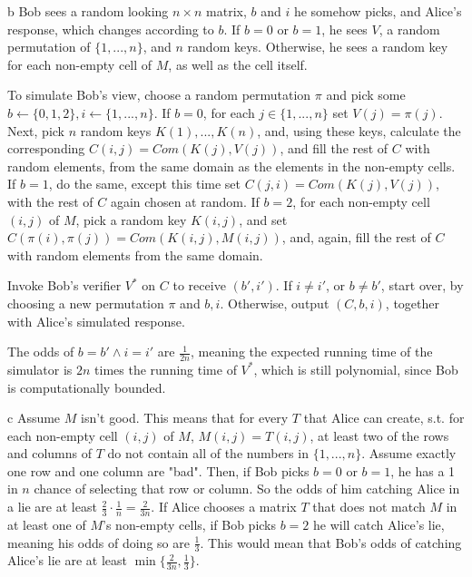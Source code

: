 \documentclass{article}
\begin{document}
\begin{paragraph}
    b Bob sees a random looking \(n \times n\) matrix, \(b\) and \(i\) he somehow picks, and Alice's response, which changes according to \(b\). If \(b = 0\) or \(b = 1\), he sees \(V\), a random permutation of \(\{1, ..., n\}\), and \(n\) random keys. Otherwise, he sees a random key for each non-empty cell of \(M\), as well as the cell itself.
    
    To simulate Bob's view, choose a random permutation \(\pi\) and pick some \(b \leftarrow \{0, 1, 2\}, i \leftarrow \{1, ..., n\}\). If \(b = 0\), for each \(j \in \{1, ..., n\}\) set \(V(j) = \pi(j)\). Next, pick \(n\) random keys \(K(1), ..., K(n)\), and, using these keys, calculate the corresponding \(C(i, j) = Com(K(j), V(j))\), and fill the rest of \(C\) with random elements, from the same domain as the elements in the non-empty cells. If \(b = 1\), do the same, except this time set \(C(j, i) = Com(K(j), V(j))\), with the rest of \(C\) again chosen at random. If \(b = 2\), for each non-empty cell \((i, j)\) of \(M\), pick a random key \(K(i, j)\), and set \(C(\pi(i), \pi(j)) = Com(K(i, j), M(i, j))\), and, again, fill the rest of \(C\) with random elements from the same domain.
    
    Invoke Bob's verifier \(V^*\) on \(C\) to receive \((b', i')\). If \(i \neq i'\), or \(b \neq b'\), start over, by choosing a new permutation \(\pi\) and \(b, i\). Otherwise, output \((C, b, i)\), together with Alice's simulated response.
    
    The odds of \(b = b' \wedge i = i'\) are \(\frac{1}{2n}\), meaning the expected running time of the simulator is \(2n\) times the running time of \(V^*\), which is still polynomial, since Bob is computationally bounded.
\end{paragraph}

\begin{paragraph}
    c Assume \(M\) isn't good. This means that for every \(T\) that Alice can create, s.t. for each non-empty cell \((i, j)\) of \(M\), \(M(i, j) = T(i, j)\), at least two of the rows and columns of \(T\) do not contain all of the numbers in \(\{1, ..., n\}\). Assume exactly one row and one column are "bad". Then, if Bob picks \(b = 0\) or \(b = 1\), he has a 1 in \(n\) chance of selecting that row or column. So the odds of him catching Alice in a lie are at least \(\frac{2}{3} \cdot \frac{1}{n} = \frac{2}{3n}\). If Alice chooses a matrix \(T\) that does not match \(M\) in at least one of \(M\)'s non-empty cells, if Bob picks \(b = 2\) he will catch Alice's lie, meaning his odds of doing so are \(\frac{1}{3}\). This would mean that Bob's odds of catching Alice's lie are at least \(\min\{\frac{2}{3n}, \frac{1}{3}\}\).
\end{paragraph}
\end{document}
